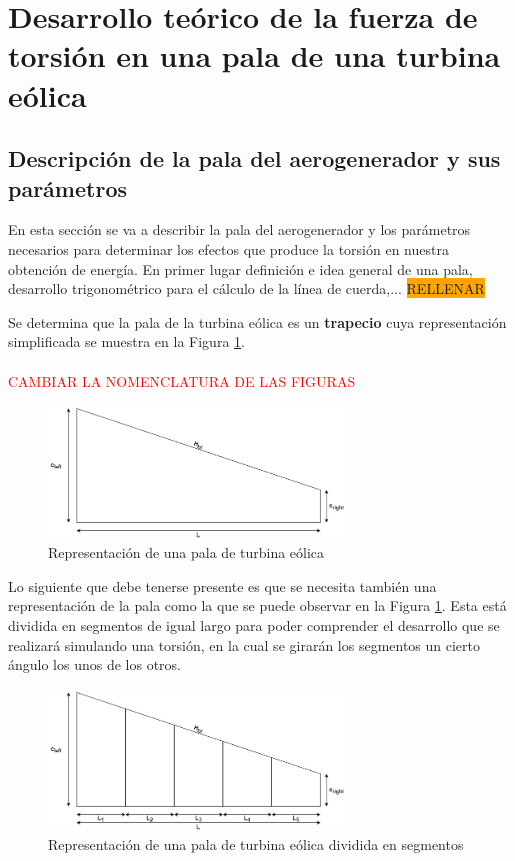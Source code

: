 \section{Desarrollo teórico de la fuerza de torsión en una pala de una turbina eólica}

\subsection{Descripción de la pala del aerogenerador y sus parámetros}

En esta sección se va a describir la pala del aerogenerador y los parámetros necesarios para determinar los efectos que produce la torsión en nuestra obtención de energía. En primer lugar definición e idea general de una pala, desarrollo trigonométrico para el cálculo de la línea de cuerda,... \colorbox{orange}{RELLENAR}


Se determina que la pala de la turbina eólica es un \textbf{trapecio} cuya representación simplificada se muestra en la Figura \ref{fig:pala_simp}. \\\\


\textcolor{red}{\Large{CAMBIAR LA NOMENCLATURA DE LAS FIGURAS}}

\begin{figure}[H]
    \centering
    \includegraphics[width=0.7\textwidth]{images/pala simple.png}
    \caption{Representación de una pala de turbina eólica}
    \label{fig:pala_simp}
\end{figure}


Lo siguiente que debe tenerse presente es que se necesita también una representación de la pala como la que se puede observar en la Figura \ref{fig:pala_simp}. Esta está dividida en segmentos de igual largo para poder comprender el desarrollo que se realizará simulando una torsión, en la cual se girarán los segmentos un cierto ángulo los unos de los otros.

\begin{figure}[H]
    \centering
    \includegraphics[width=0.7\textwidth]{images/pala simple segmentada.png}
    \caption{Representación de una pala de turbina eólica dividida en segmentos}
    \label{fig:pala_dividida}
\end{figure}

